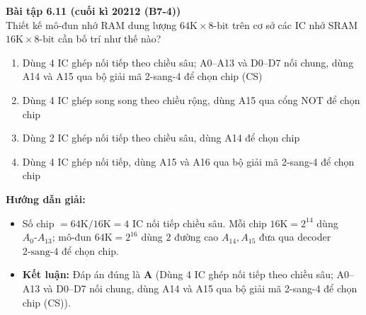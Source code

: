 \textbf{Bài tập 6.11 (cuối kì 20212 (B7-4))}\\
Thiết kế mô-đun nhớ RAM dung lượng $64\text{K} \times 8\text{-bit}$ trên cơ sở các IC nhớ SRAM $16\text{K} \times 8\text{-bit}$ cần bố trí như thế nào?
\begin{enumerate}[label=\Alph*.]
    \item Dùng 4 IC ghép nối tiếp theo chiều sâu; A0--A13 và D0--D7 nối chung, dùng A14 và A15 qua bộ giải mã 2-sang-4 để chọn chip (CS)
    \item Dùng 4 IC ghép song song theo chiều rộng, dùng A15 qua cổng NOT để chọn chip
    \item Dùng 2 IC ghép nối tiếp theo chiều sâu, dùng A14 để chọn chip
    \item Dùng 4 IC ghép nối tiếp, dùng A15 và A16 qua bộ giải mã 2-sang-4 để chọn chip
\end{enumerate}
\textbf{Hướng dẫn giải:}
\begin{itemize}
    \item Số chip $= 64\text{K} / 16\text{K} = 4$ IC nối tiếp chiều sâu. Mỗi chip $16\text{K} = 2^{14}$ dùng $A_0\text{-}A_{13}$; mô-đun $64\text{K} = 2^{16}$ dùng $2$ đường cao $A_{14}, A_{15}$ đưa qua decoder $2\text{-sang-}4$ để chọn chip.
    \item \textbf{Kết luận:} Đáp án đúng là \textbf{A} (Dùng 4 IC ghép nối tiếp theo chiều sâu; A0--A13 và D0--D7 nối chung, dùng A14 và A15 qua bộ giải mã 2-sang-4 để chọn chip (CS)).
\end{itemize}

